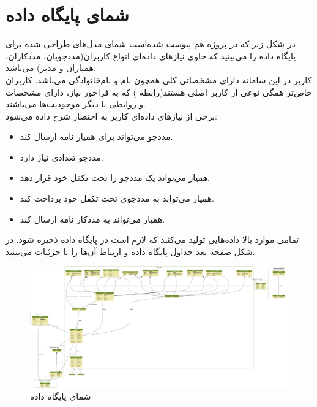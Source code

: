 \documentclass[11pt]{article}
\begin{document}
	\section{شمای پایگاه داده}
	در شکل زیر که در پروژه هم پیوست شده‌است شمای مدل‌های طراحی شده برای پایگاه داده را می‌بینید که حاوی نیاز‌های داده‌ای انواع کاربران(مددجویان، مددکاران، همیاران و مدیر) می‌باشد.\\
	کاربر در این سامانه دارای مشخصاتی کلی همچون نام و نام‌خانوادگی می‌باشد. کاربران خاص‌تر همگی نوعی از کاربر اصلی هستند(رابطه  ) که به فراخور نیاز، دارای مشخصات و روابطی با دیگر موجودیت‌ها می‌باشند.\\
	برخی از نیاز‌های داده‌ای کاربر به اختصار شرح داده می‌شود:
	\begin{itemize}
		\item مددجو می‌تواند برای همیار نامه ارسال کند.
		\item مددجو تعدادی نیاز دارد.
		\item همیار می‌تواند یک مددجو را تحت تکفل خود قرار دهد.
		\item همیار می‌تواند به مددجوی تحت تکفل خود پرداخت کند.
		\item همیار می‌تواند به مددکار نامه ارسال کند.
	\end{itemize}
	تمامی موارد بالا داده‌هایی تولید می‌کنند که لازم است در پایگاه داده ذخیره شود. در شکل صفحه بعد جداول پایگاه داده و ارتباط آن‌ها را با جزئیات می‌بینید.
	\newpage
	\begin{figure}
	\centering
	\includegraphics[width=\textwidth]{ChildF_visualized.png}
	\caption{شمای پایگاه داده}
	\end{figure}	
	
\end{document}
